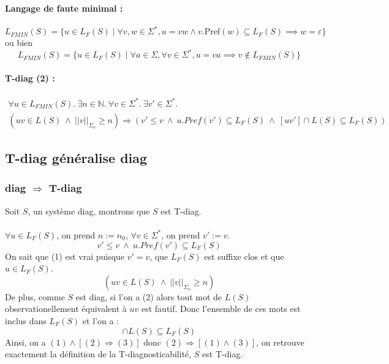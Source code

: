 \documentclass[10pt,a4paper]{article}
\begin{document}
\paragraph{Langage de faute minimal :}
$$L_{FMIN}(S) = \{u \in L_F(S) \mid \forall v,w \in \Sigma^*, u = vw \land v.\text{Pref}(w)\subseteq L_F(S) \implies w = \varepsilon \}$$
ou bien
$$L_{FMIN}(S) = \{u \in L_F(S) \mid \forall a \in \Sigma, \forall v \in \Sigma^*, u = va \implies v \not \in L_{FMIN}(S)\}$$
\paragraph{T-diag (2) :}
\begin{multline*}
\forall u \in L_{FMIN}(S).\ \exists n \in \mathbb{N}.\ \forall v \in \Sigma^*.\ \exists v' \in \Sigma^*. \\
(uv \in L(S) \ \wedge \  ||v||_{\Sigma_o}\geq n) \Rightarrow (v'\leq v \ \wedge \  u.Pref(v') \subseteq L_F(S) \ \wedge \  [uv'] \cap L(S) \subseteq L_F(S))
\end{multline*}


\subsection{T-diag généralise diag}

\subsubsection{diag $\Rightarrow$ T-diag}

Soit $S$, un système diag, montrons que $S$ est T-diag. 
\paragraph{}
\noindent $\forall u \in L_{F}(S)$, on prend $n := n_0$, $\forall v \in \Sigma^*$, on prend $v' := v$. 
\begin{equation}
v'\leq v \ \wedge \  u.Pref(v') \subseteq L_F(S)
\end{equation}
On sait que (1) est vrai puisque $v'=v$, que $L_F(S)$ est suffixe clos et que $u \in L_F(S)$.
\begin{equation}
(uv \in L(S) \ \wedge \  ||v||_{\Sigma_o}\geq n)
\end{equation}
De plus, comme $S$ est diag, si l'on a (2) alors tout mot de $L(S)$ observationellement équivalent à $uv$ est fautif. Donc l'ensemble de ces mots est inclus dans $L_F(S)$ et l'on a :
\begin{equation}
[uv'] \cap L(S) \subseteq L_F(S)
\end{equation}
Ainsi, on a $(1) \wedge [ (2)  \Rightarrow (3) ]$ donc $(2)  \Rightarrow [ (1) \wedge (3) ]$, on retrouve exactement la définition de la T-diagnosticabilité, $S$ est T-diag.
\end{document}
